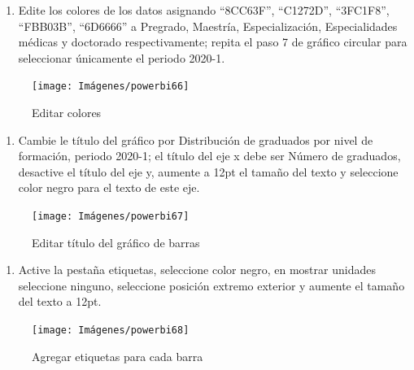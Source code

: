 \documentclass[
]{book}
\providecommand{\tightlist}{%
  \setlength{\itemsep}{0pt}\setlength{\parskip}{0pt}}
\begin{document}
\begin{enumerate}
\def\labelenumi{\arabic{enumi}.}
\setcounter{enumi}{2}
\tightlist
\item
  Edite los colores de los datos asignando ``8CC63F'', ``C1272D'', ``3FC1F8'', ``FBB03B'', ``6D6666'' a Pregrado, Maestría, Especialización, Especialidades médicas y doctorado respectivamente; repita el paso 7 de gráfico circular para seleccionar únicamente el periodo 2020-1.
\end{enumerate}

\begin{figure}

{\centering \texttt{[image: Imágenes/powerbi66]} 

}

\caption{Editar colores}\label{fig:paso3barras-fig}
\end{figure}

\begin{enumerate}
\def\labelenumi{\arabic{enumi}.}
\setcounter{enumi}{3}
\tightlist
\item
  Cambie le título del gráfico por Distribución de graduados por nivel de formación, periodo 2020-1; el título del eje x debe ser Número de graduados, desactive el título del eje y, aumente a 12pt el tamaño del texto y seleccione color negro para el texto de este eje.
\end{enumerate}

\begin{figure}

{\centering \texttt{[image: Imágenes/powerbi67]} 

}

\caption{Editar título del gráfico de barras}\label{fig:paso4barras-fig}
\end{figure}

\begin{enumerate}
\def\labelenumi{\arabic{enumi}.}
\setcounter{enumi}{4}
\tightlist
\item
  Active la pestaña etiquetas, seleccione color negro, en mostrar unidades seleccione ninguno, seleccione posición extremo exterior y aumente el tamaño del texto a 12pt.
\end{enumerate}

\begin{figure}

{\centering \texttt{[image: Imágenes/powerbi68]} 

}

\caption{Agregar etiquetas para cada barra}\label{fig:paso5barras-fig}
\end{figure}
\end{document}

